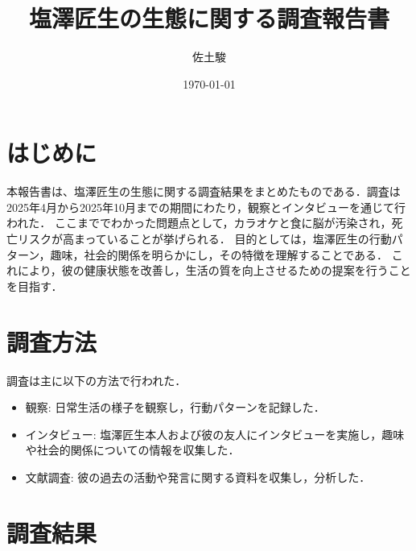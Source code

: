 \documentclass[uplatex,dvipdfmx]{jsarticle}
\begin{document}
\title{塩澤匠生の生態に関する調査報告書}
\author{佐土駿}
\date{\today}
\maketitle

\tableofcontents
\newpage    
\section{はじめに}
本報告書は、塩澤匠生の生態に関する調査結果をまとめたものである．調査は2025年4月から2025年10月までの期間にわたり，観察とインタビューを通じて行われた．
ここまででわかった問題点として，カラオケと食に脳が汚染され，死亡リスクが高まっていることが挙げられる．
目的としては，塩澤匠生の行動パターン，趣味，社会的関係を明らかにし，その特徴を理解することである．
これにより，彼の健康状態を改善し，生活の質を向上させるための提案を行うことを目指す．

\section{調査方法}
調査は主に以下の方法で行われた．
\begin{itemize}
    \item 観察: 日常生活の様子を観察し，行動パターンを記録した．
    \item インタビュー: 塩澤匠生本人および彼の友人にインタビューを実施し，趣味や社会的関係についての情報を収集した．
    \item 文献調査: 彼の過去の活動や発言に関する資料を収集し，分析した．
\end{itemize}

\section{調査結果}
\end{document}
